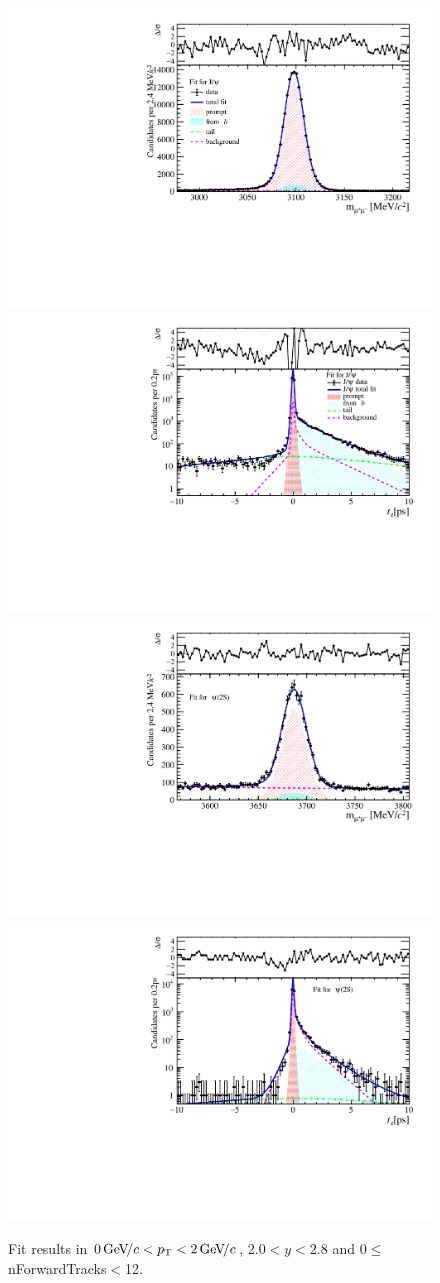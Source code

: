 \begin{figure}[H]
\begin{center}
\includegraphics[width=0.47\linewidth]{pdf/Jpsi/drawmassF/n1y1pt1.pdf}
\includegraphics[width=0.47\linewidth]{pdf/Jpsi/2DFitF/n1y1pt1.pdf}
\vspace*{-0.5cm}
\includegraphics[width=0.47\linewidth]{pdf/Psi2S/drawmassF/n1y1pt1.pdf}
\includegraphics[width=0.47\linewidth]{pdf/Psi2S/2DFitF/n1y1pt1.pdf}
\vspace*{-0.5cm}
\end{center}
\caption{Fit results in $0\text{\,Ge\kern -0.1em V\!/}c<p_{\mathrm{T}}<2\text{\,Ge\kern -0.1em V\!/}c$, $2.0<y<2.8$ and 0$\leq$nForwardTracks$<$12.}
\label{Fitn1y1pt1}
\end{figure}
